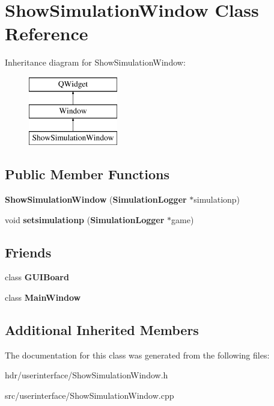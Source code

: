 \section{Show\-Simulation\-Window Class Reference}
\label{class_show_simulation_window}
Inheritance diagram for Show\-Simulation\-Window\-:\begin{figure}[H]
\begin{center}
\leavevmode
\includegraphics[height=3.000000cm]{class_show_simulation_window}
\end{center}
\end{figure}
\subsection*{Public Member Functions}
\begin{DoxyCompactItemize}
\item 
{\bfseries Show\-Simulation\-Window} ({\bf Simulation\-Logger} $\ast$simulationp)\label{class_show_simulation_window_ac3228fe7deb7a1a313d9eeb1b3fa25ea}

\item 
void {\bfseries setsimulationp} ({\bf Simulation\-Logger} $\ast$game)\label{class_show_simulation_window_a7cc9d103f7e9bf078cdd7bf8492bb741}

\end{DoxyCompactItemize}
\subsection*{Friends}
\begin{DoxyCompactItemize}
\item 
class {\bfseries G\-U\-I\-Board}\label{class_show_simulation_window_ad8e2a5cdc9f95279c682c75f25571f08}

\item 
class {\bfseries Main\-Window}\label{class_show_simulation_window_af9db4b672c4d3104f5541893e08e1809}

\end{DoxyCompactItemize}
\subsection*{Additional Inherited Members}


The documentation for this class was generated from the following files\-:\begin{DoxyCompactItemize}
\item 
hdr/userinterface/Show\-Simulation\-Window.\-h\item 
src/userinterface/Show\-Simulation\-Window.\-cpp\end{DoxyCompactItemize}
